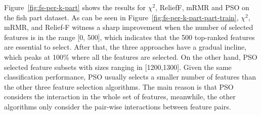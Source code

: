 \documentclass[runningheads]{llncs}
\begin{document}
Figure~\ref{fig:fs-per-k-part} shows the results for $\chi^2$, ReliefF, mRMR and PSO on the fish part dataset. 
As can be seen in Figure~\ref{fig:fs-per-k-part-part-train}, $\chi^2$, mRMR, and Relief-F witness a sharp improvement when the number of selected features is in the range [0, 500], which indicates that the 500 top-ranked features are essential to select. 
After that, the three approaches have a gradual incline, which peaks at 100\% where all the features are selected. 
On the other hand, PSO selected feature subsets with sizes ranging in [1200,1300]. 
Given the same classification performance, PSO usually selects a smaller number of features than the other three feature selection algorithms. 
The main reason is that PSO considers the interaction in the whole set of features, meanwhile, the other algorithms only consider the pair-wise interactions between feature pairs. 
\end{document}
